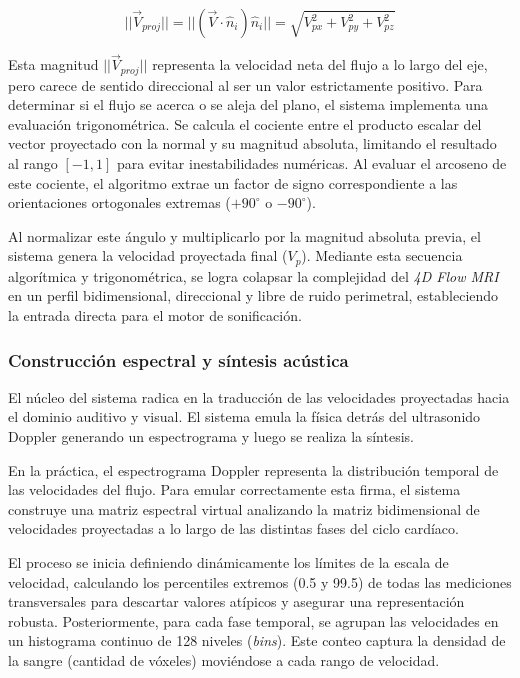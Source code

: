 \begin{equation}
    ||\vec{V}_{proj}|| = ||(\vec{V} \cdot \hat{n}_i) \hat{n}_i|| = \sqrt{V_{px}^2 + V_{py}^2 + V_{pz}^2}
    \label{eq:proyeccion_vectorial}
\end{equation}


Esta magnitud $||\vec{V}_{proj}||$ representa la velocidad neta del flujo a lo largo del eje, pero carece de sentido direccional al ser un valor estrictamente positivo. Para determinar si el flujo se acerca o se aleja del plano, el sistema implementa una evaluación trigonométrica. Se calcula el cociente entre el producto escalar del vector proyectado con la normal y su magnitud absoluta, limitando el resultado al rango $[-1, 1]$ para evitar inestabilidades numéricas. Al evaluar el arcoseno de este cociente, el algoritmo extrae un factor de signo correspondiente a las orientaciones ortogonales extremas ($+90^\circ$ o $-90^\circ$).

Al normalizar este ángulo y multiplicarlo por la magnitud absoluta previa, el sistema genera la velocidad proyectada final ($V_p$). Mediante esta secuencia algorítmica y trigonométrica, se logra colapsar la complejidad del \textit{4D Flow MRI} en un perfil bidimensional, direccional y libre de ruido perimetral, estableciendo la entrada directa para el motor de sonificación.

\subsubsection{Construcción espectral y síntesis acústica}

El núcleo del sistema radica en la traducción de las velocidades proyectadas hacia el dominio auditivo y visual. El sistema emula la física detrás del ultrasonido Doppler generando un espectrograma y luego se realiza la síntesis. 

En la práctica, el espectrograma Doppler representa la distribución temporal de las velocidades del flujo. Para emular correctamente esta firma, el sistema construye una matriz espectral virtual analizando la matriz bidimensional de velocidades proyectadas a lo largo de las distintas fases del ciclo cardíaco.

El proceso se inicia definiendo dinámicamente los límites de la escala de velocidad, calculando los percentiles extremos (0.5 y 99.5) de todas las mediciones transversales para descartar valores atípicos y asegurar una representación robusta. Posteriormente, para cada fase temporal, se agrupan las velocidades en un histograma continuo de 128 niveles (\textit{bins}). Este conteo captura la densidad de la sangre (cantidad de vóxeles) moviéndose a cada rango de velocidad.


